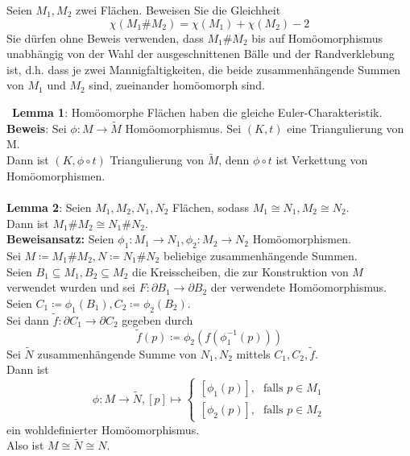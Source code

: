 \begin{assignment}
  Seien \( M_1, M_2 \) zwei Flächen. Beweisen Sie die Gleichheit 
  \begin{equation*}
     \chi(M_1 \# M_2) = \chi(M_1) + \chi(M_2) - 2
  \end{equation*}
  Sie dürfen ohne Beweis verwenden, dass $M_1 \# M_2 $ bis auf Homöomorphismus unabhängig von der Wahl der ausgeschnittenen Bälle und der Randverklebung ist, d.h. dass je zwei Mannigfaltigkeiten, die beide zusammenhängende Summen von $ M_1 $ und $M_2$ sind, zueinander homöomorph sind.
\end{assignment}
\begin{solution}
\
  \textbf{Lemma 1}: Homöomorphe Flächen haben die gleiche Euler-Charakteristik. \\
  \textbf{Beweis}: Sei \( \phi : M \to \tilde{M} \) Homöomorphismus. Sei \( (K,t) \) eine Triangulierung von M. \\
  Dann ist \( (K,\phi \circ t) \) Triangulierung von \( \tilde{M} \), denn \( \phi \circ t \) ist Verkettung von Homöomorphismen. \\
  \  \\
  \textbf{Lemma 2}: Seien \( M_1, M_2, N_1, N_2 \) Flächen, sodass \( M_1 \cong N_1, M_2 \cong N_2 \). \\
  Dann ist \( M_1 \# M_2 \cong N_1 \# N_2 \). \\
  \textbf{Beweisansatz:} Seien \( \phi_1: M_1 \to N_1, \phi_2: M_2 \to N_2 \) Homöomorphismen. \\
  Sei \( M \coloneqq M_1 \# M_2 , N \coloneqq N_1 \# N_2 \) beliebige zusammenhängende Summen. \\
  Seien \( B_1 \subseteq M_1, B_2 \subseteq M_2 \) die Kreisscheiben, die zur Konstruktion von \( M \) verwendet wurden und sei \( F: \partial B_1 \to \partial B_2 \) der verwendete Homöomorphismus. \\
  Seien \( C_1 \coloneqq \phi_1 (B_1), C_2 \coloneqq \phi_2 (B_2) \). \\
  Sei dann \( \tilde{f} : \partial C_1 \to \partial C_2 \) gegeben durch 
  \begin{equation*}
    \tilde{f}(p) \coloneqq \phi_2 (f(\phi_1^{-1}(p)))
  \end{equation*}
  Sei \( \tilde{N} \) zusammenhängende Summe von \( N_1, N_2 \) mittels \( C_1, C_2, \tilde{f} \). \\
  Dann ist
  \begin{equation*}
    \phi: M \to \tilde{N}, [p] \mapsto \begin{cases}
      [\phi_1(p)]\text{,} &\text{falls } p \in M_1 \\
      [\phi_2(p)]\text{,} &\text{falls } p \in M_2
    \end{cases}
  \end{equation*}
  ein wohldefinierter Homöomorphismus. \\
  Also ist \( M \cong \tilde{N} \cong N \). \\
  

\end{solution}
